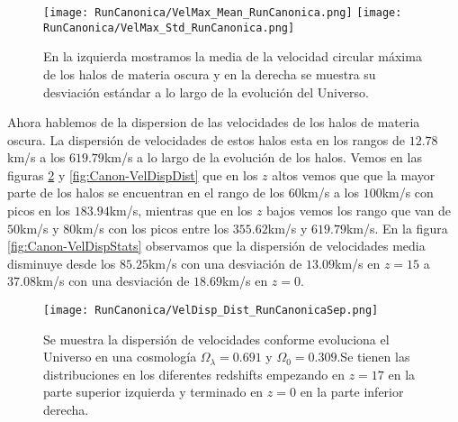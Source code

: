 \begin{figure}[H]
    \centering
    \texttt{[image: RunCanonica/VelMax\_Mean\_RunCanonica.png]}
    \texttt{[image: RunCanonica/VelMax\_Std\_RunCanonica.png]}
    \caption[Media y desviación estándar de la velocidad circular máxima]{\footnotesize En la izquierda mostramos la media de la velocidad circular máxima de los halos de materia oscura y en la derecha se muestra su desviación estándar a lo largo de la evolución del Universo.}
    \label{fig:Canon-VelMaxStats}
\end{figure}

Ahora hablemos de la dispersion de las velocidades de los halos de materia oscura. La dispersión de velocidades de estos halos esta en los rangos de $12.78$km/s a los $619.79$km/s a lo largo de la evolución de los halos. Vemos en las figuras \ref{fig:Canon-VelDispDistSep} y \ref{fig:Canon-VelDispDist} que en los $z$ altos vemos que que la mayor parte de los halos se encuentran en el rango de los $60$km/s a los $100$km/s con picos en los $183.94$km/s, mientras que en los $z$ bajos vemos los rango que van de $50$km/s y $80$km/s con los picos entre los $355.62$km/s y $619.79$km/s. En la figura \ref{fig:Canon-VelDispStats} observamos que la dispersión de velocidades media disminuye desde los $85.25$km/s con una desviación de $13.09$km/s en $z=15$ a $37.08$km/s con una desviación de $18.69$km/s en $z=0$.


\begin{figure}[H]
    \centering
    \texttt{[image: RunCanonica/VelDisp\_Dist\_RunCanonicaSep.png]}
    \caption[Dispersión de velocidades]{\footnotesize Se muestra la dispersión de velocidades conforme evoluciona el Universo en una cosmología $\Omega_\lambda = 0.691 $ y $\Omega_0 = 0.309$.Se tienen las distribuciones en los diferentes redshifts empezando en $z=17$ en la parte superior izquierda y terminado en $z=0$ en la parte inferior derecha.}
    \label{fig:Canon-VelDispDistSep}
\end{figure}


